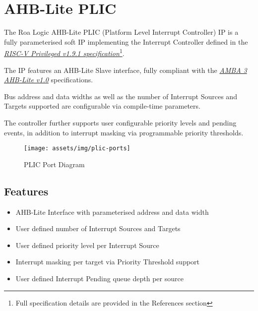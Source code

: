 \chapter{AHB-Lite PLIC}

The Roa Logic AHB-Lite PLIC (Platform Level Interrupt Controller) IP is a fully parameterised soft IP implementing the Interrupt Controller defined in the \emph{\href{https://github.com/riscv/riscv-isa-manual/blob/master/release/riscv-privileged-v1.9.1.pdf}{RISC-V Privileged v1.9.1 specification}}\footnote{Full specification details are provided in the References section}.

The IP features an AHB-Lite Slave interface, fully compliant with the \emph{\href{https://www.arm.com/products/system-ip/amba-specifications}{AMBA 3 AHB-Lite v1.0}} specifications. 

Bus address and data widths as well as the number of Interrupt Sources and Targets supported are configurable via compile-time parameters.

The controller further supports user configurable priority levels and pending events, in addition to interrupt masking via programmable priority thresholds.

\begin{figure}[!htb]
  \texttt{[image: assets/img/plic-ports]}
  \caption{PLIC Port Diagram}
  \label{fig:PORTDIAG}
\end{figure}

\section{Features}

\begin{itemize}
\item
  AHB-Lite Interface with parameterised address and data width
\item
  User defined number of Interrupt Sources and Targets
\item
User defined priority level per Interrupt Source
\item
Interrupt masking per target via Priority Threshold support
\item
  User defined Interrupt Pending queue depth per source
\end{itemize}
